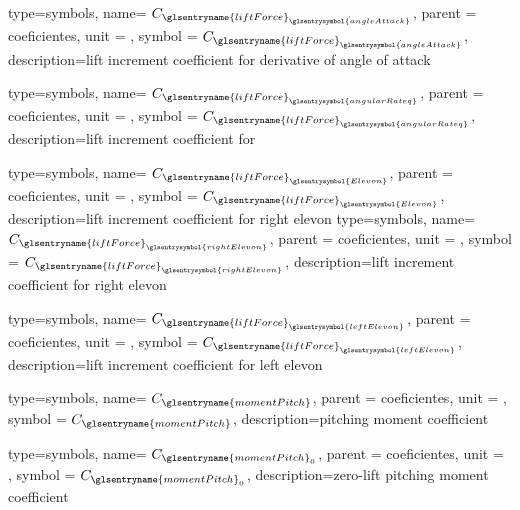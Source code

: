 {type=symbols,
    name= \ensuremath{C_{{\glsentryname{liftForce}}_{\dot{\glsentrysymbol{angleAttack}}}}},
    parent = {coeficientes},
    unit = \unexpanded{},
    symbol = \ensuremath{C_{{\glsentryname{liftForce}}_{\dot{\glsentrysymbol{angleAttack}}}}},
    description={lift increment coefficient for derivative of angle of attack}
}

{type=symbols,
    name= \ensuremath{C_{{\glsentryname{liftForce}}_{\glsentrysymbol{angularRateq}}}},
    parent = {coeficientes},
    unit = \unexpanded{},
    symbol = \ensuremath{C_{{\glsentryname{liftForce}}_{\glsentrysymbol{angularRateq}}}},
    description={lift increment coefficient for }
}

{type=symbols,
    name= \ensuremath{C_{{\glsentryname{liftForce}}_{\glsentrysymbol{Elevon}}}},
    parent = {coeficientes},
    unit = \unexpanded{},
    symbol = \ensuremath{C_{{\glsentryname{liftForce}}_{\glsentrysymbol{Elevon}}}},
    description={lift increment coefficient for right elevon}
}
{type=symbols,
    name= \ensuremath{C_{{\glsentryname{liftForce}}_{\glsentrysymbol{rightElevon}}}},
    parent = {coeficientes},
    unit = \unexpanded{},
    symbol = \ensuremath{C_{{\glsentryname{liftForce}}_{\glsentrysymbol{rightElevon}}}},
    description={lift increment coefficient for right elevon}
}

{type=symbols,
    name= \ensuremath{C_{{\glsentryname{liftForce}}_{\glsentrysymbol{leftElevon}}}},
    parent = {coeficientes},
    unit = \unexpanded{},
    symbol = \ensuremath{C_{{\glsentryname{liftForce}}_{\glsentrysymbol{leftElevon}}}},
    description={lift increment coefficient for left elevon}
}



{type=symbols,
    name= \ensuremath{C_{\glsentryname{momentPitch}}},
    parent = {coeficientes},
    unit = \unexpanded{},
    symbol = \ensuremath{C_{\glsentryname{momentPitch}}},
    description={pitching moment coefficient}
}

{type=symbols,
    name= \ensuremath{C_{{\glsentryname{momentPitch}}_{0}}},
    parent = {coeficientes},
    unit = \unexpanded{},
    symbol = \ensuremath{C_{{\glsentryname{momentPitch}}_{0}}},
    description={zero-lift pitching moment coefficient}
}


